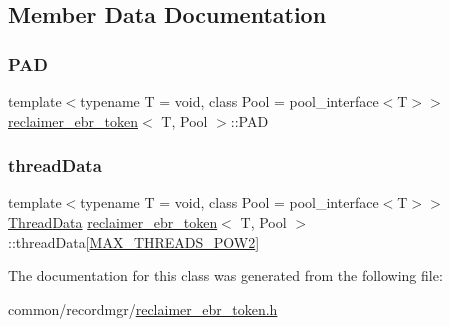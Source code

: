 \subsection{Member Data Documentation}
\mbox{\label{classreclaimer__ebr__token_a73eb1600dc86a4999e9ce31b07076f97}} 
\subsubsection{\texorpdfstring{P\+AD}{PAD}}
{\footnotesize\ttfamily template$<$typename T  = void, class Pool  = pool\+\_\+interface$<$\+T$>$$>$ \\
\hyperlink{classreclaimer__ebr__token}{reclaimer\+\_\+ebr\+\_\+token}$<$ T, Pool $>$\+::P\+AD\hspace{0.3cm}{\ttfamily [protected]}}

\mbox{\label{classreclaimer__ebr__token_a321a12296aabc232eb2cabbba1164b14}} 
\subsubsection{\texorpdfstring{thread\+Data}{threadData}}
{\footnotesize\ttfamily template$<$typename T  = void, class Pool  = pool\+\_\+interface$<$\+T$>$$>$ \\
\hyperlink{classreclaimer__ebr__token_1_1ThreadData}{Thread\+Data} \hyperlink{classreclaimer__ebr__token}{reclaimer\+\_\+ebr\+\_\+token}$<$ T, Pool $>$\+::thread\+Data\mbox{[}\hyperlink{plaf_8h_ac1585a3455dd3e33e877e588be9e466b}{M\+A\+X\+\_\+\+T\+H\+R\+E\+A\+D\+S\+\_\+\+P\+O\+W2}\mbox{]}\hspace{0.3cm}{\ttfamily [protected]}}



The documentation for this class was generated from the following file\+:\begin{DoxyCompactItemize}
\item 
common/recordmgr/\hyperlink{reclaimer__ebr__token_8h}{reclaimer\+\_\+ebr\+\_\+token.\+h}\end{DoxyCompactItemize}
